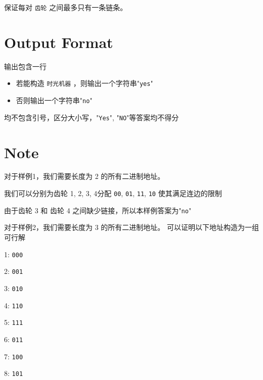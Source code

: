 \documentclass[a4paper, 12pt]{article}
\begin{document}
    保证每对 \texttt{齿轮} 之间最多只有一条链条。
    \section*{Output Format}
        输出包含一行
        \begin{itemize}
            \item
            若能构造 \texttt{时光机器} ，则输出一个字符串"\texttt{yes}"
            \item
            否则输出一个字符串"\texttt{no}"
        \end{itemize}

        均不包含引号，区分大小写，"\texttt{Yes}", "\texttt{NO}"等答案均不得分

    \section*{Note}

        对于样例1，我们需要长度为 2 的所有二进制地址。

        我们可以分别为齿轮 1, 2, 3, 4分配 \texttt{00}, \texttt{01}, \texttt{11}, \texttt{10} 使其满足连边的限制

        由于齿轮 3 和 齿轮 4 之间缺少链接，所以本样例答案为"\texttt{no}"


        对于样例2，我们需要长度为 3 的所有二进制地址。
        可以证明以下地址构造为一组可行解

        1: \texttt{000}

        2: \texttt{001}

        3: \texttt{010}

        4: \texttt{110}

        5: \texttt{111}

        6: \texttt{011}

        7: \texttt{100}

        8: \texttt{101}
\end{document}
